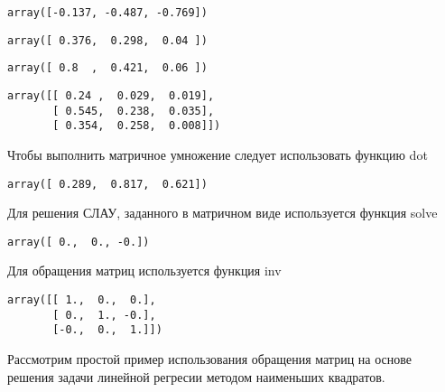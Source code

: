 \documentclass{article}
\begin{document}
    

    
    
    \begin{verbatim}
array([-0.137, -0.487, -0.769])
    \end{verbatim}

    

    
    
    \begin{verbatim}
array([ 0.376,  0.298,  0.04 ])
    \end{verbatim}

    

    
    
    \begin{verbatim}
array([ 0.8  ,  0.421,  0.06 ])
    \end{verbatim}

    

    
    
    \begin{verbatim}
array([[ 0.24 ,  0.029,  0.019],
       [ 0.545,  0.238,  0.035],
       [ 0.354,  0.258,  0.008]])
    \end{verbatim}

    

    Чтобы выполнить матричное умножение следует использовать функцию dot

    
    
    \begin{verbatim}
array([ 0.289,  0.817,  0.621])
    \end{verbatim}

    

    Для решения СЛАУ, заданного в матричном виде используется функция solve

    
    
    \begin{verbatim}
array([ 0.,  0., -0.])
    \end{verbatim}

    

    Для обращения матриц используется функция inv

    
    
    \begin{verbatim}
array([[ 1.,  0.,  0.],
       [ 0.,  1., -0.],
       [-0.,  0.,  1.]])
    \end{verbatim}

    

    Рассмотрим простой пример использования обращения матриц на основе
решения задачи линейной регресии методом наименьших квадратов.
\end{document}
